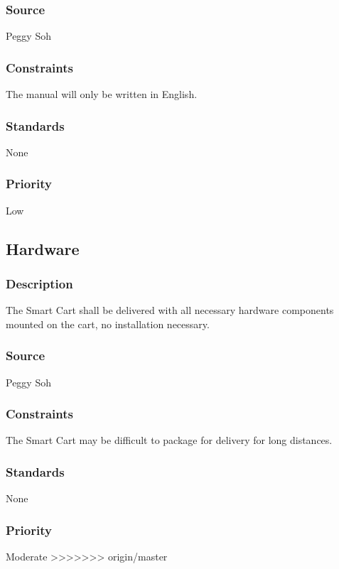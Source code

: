 \subsubsection{Source}
Peggy Soh
\subsubsection{Constraints}
The manual will only be written in English.
\subsubsection{Standards}
None
\subsubsection{Priority}
Low


\subsection{Hardware}
\subsubsection{Description}
The Smart Cart shall be delivered with all necessary hardware components mounted on the cart, no installation necessary. 
\subsubsection{Source}
Peggy Soh
\subsubsection{Constraints}
The Smart Cart may be difficult to package for delivery for long distances.
\subsubsection{Standards}
None
\subsubsection{Priority}
Moderate
>>>>>>> origin/master
